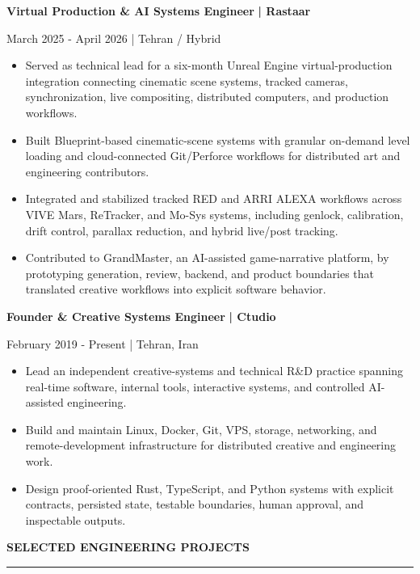 \documentclass[10pt,a4paper]{article}
\newcommand{\cvsection}[1]{%
  \Needspace{4\baselineskip}%
  \vspace{0.42em}%
  {\fontsize{10.2}{11.9}\selectfont\bfseries\color{navy}\MakeUppercase{#1}}\par
  \vspace{0.16em}\color{rule}\hrule\color{text}\vspace{0.30em}%
}
\newcommand{\cventry}[4]{%
  \Needspace{6\baselineskip}%
  {\fontsize{10.35}{12.1}\selectfont\bfseries #1} {\color{teal}\bfseries | #2}\par
  {\fontsize{9.20}{10.8}\selectfont\color{muted}#3 | #4}\par
}
\begin{document}
\cventry{Virtual Production \& AI Systems Engineer}{Rastaar}{March 2025 - April 2026}{Tehran / Hybrid}
\begin{itemize}
  \item Served as technical lead for a six-month Unreal Engine virtual-production integration connecting cinematic scene systems, tracked cameras, synchronization, live compositing, distributed computers, and production workflows.
  \item Built Blueprint-based cinematic-scene systems with granular on-demand level loading and cloud-connected Git/Perforce workflows for distributed art and engineering contributors.
  \item Integrated and stabilized tracked RED and ARRI ALEXA workflows across VIVE Mars, ReTracker, and Mo-Sys systems, including genlock, calibration, drift control, parallax reduction, and hybrid live/post tracking.
  \item Contributed to GrandMaster, an AI-assisted game-narrative platform, by prototyping generation, review, backend, and product boundaries that translated creative workflows into explicit software behavior.
\end{itemize}

\vspace{0.05em}
\cventry{Founder \& Creative Systems Engineer}{Ctudio}{February 2019 - Present}{Tehran, Iran}
\begin{itemize}
  \item Lead an independent creative-systems and technical R\&D practice spanning real-time software, internal tools, interactive systems, and controlled AI-assisted engineering.
  \item Build and maintain Linux, Docker, Git, VPS, storage, networking, and remote-development infrastructure for distributed creative and engineering work.
  \item Design proof-oriented Rust, TypeScript, and Python systems with explicit contracts, persisted state, testable boundaries, human approval, and inspectable outputs.
\end{itemize}

\cvsection{Selected Engineering Projects}
\end{document}
